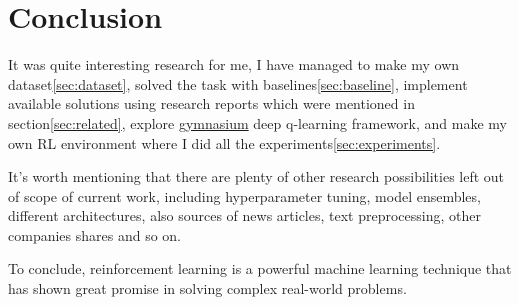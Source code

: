 \documentclass{article}
\begin{document}
\section{Conclusion}
It was quite interesting research for me, I have managed to make my own dataset\ref{sec:dataset}, solved the task with baselines\ref{sec:baseline}, implement available solutions using research reports which were mentioned in section\ref{sec:related}, explore \href{https://pypi.org/project/gymnasium/}{gymnasium}  deep q-learning framework, and make my own RL environment where I did all the experiments\ref{sec:experiments}.

It's worth mentioning that there are plenty of other research possibilities left out of scope of current work, including hyperparameter tuning, model ensembles, different architectures, also sources of news articles, text preprocessing, other companies shares and so on.

To conclude, reinforcement learning is a powerful machine learning technique that has shown great promise in solving complex real-world problems.



\end{document}
